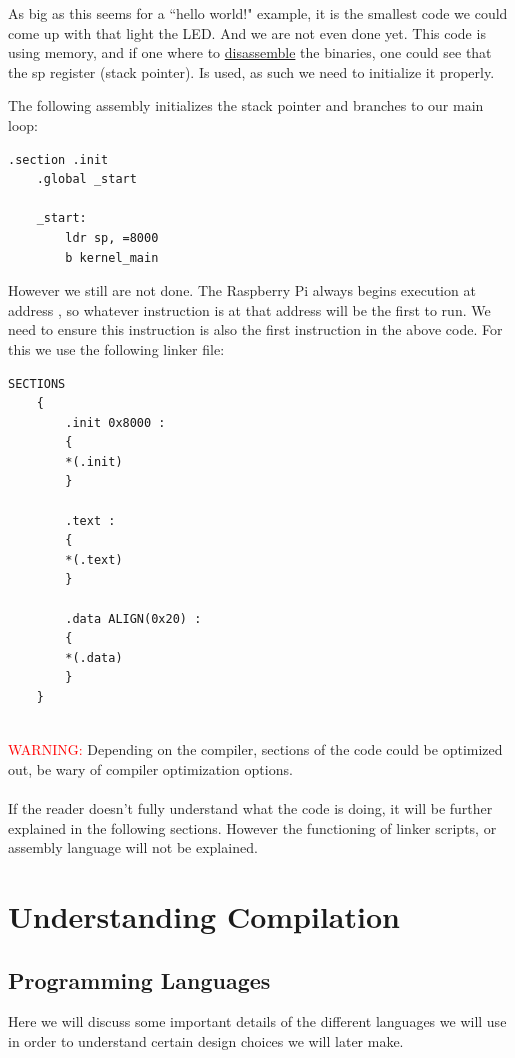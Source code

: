 \documentclass[12pt, svgnames]{book}
\begin{document}
As big as this seems for a ``hello world!" example, it is the smallest  code we could come up with that light the LED. And we are not even done yet. This code is using memory, and if one where to \hyperlink{dasm}{disassemble} the binaries, one could see that the sp register (stack pointer). Is used, as such we need to initialize it properly.

The following assembly initializes the stack pointer and branches to our main loop:
\lstset{language=ASM}
\begin{lstlisting}[style = ASM]
	.section .init
	.global _start
	
	_start:
		ldr sp, =8000
		b kernel_main
\end{lstlisting}

However we still are not done. The Raspberry Pi always begins execution at address , so whatever instruction is at that address will be the first to run. We need to ensure this instruction is also the first instruction in the above code. For this we use the following linker file:

\lstset{language=Linker}
\begin{lstlisting}[style = C]
	SECTIONS 
	{
		.init 0x8000 : 
		{
		*(.init)
		}
		
		.text : 
		{
		*(.text)
		}
		
		.data ALIGN(0x20) : 
		{
		*(.data)
		}
	}
	
\end{lstlisting}

\textcolor{red}{WARNING:} Depending on the compiler, sections of the code could be optimized out, be wary of compiler optimization options.
\\~\\
If the reader doesn't fully understand what the  code is doing, it will be further explained in the following sections. However the functioning of linker scripts, or assembly language will not be explained.

\chapter{Understanding Compilation}

\section{Programming Languages}
\label{sec:Programming Languages}
Here we will discuss some important details of the different languages we will use in order to understand certain design choices we will later make.
\end{document}
